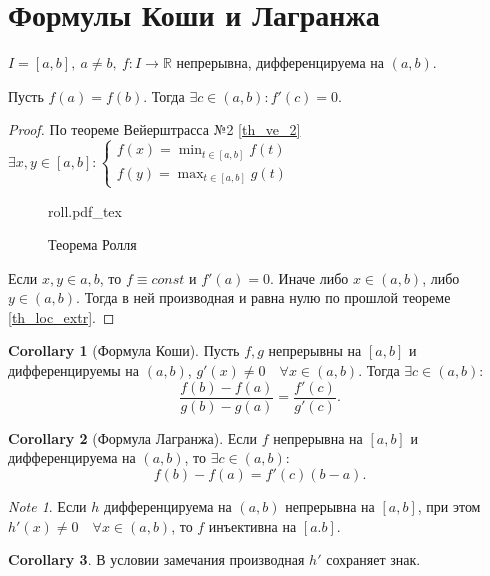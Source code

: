 \documentclass[11pt]{book}
\newcommand{\incfig}[1]{%
    \def\svgwidth{\columnwidth}
    {#1.pdf_tex}
}
\newcommand{\R}{\mathbb{R}}
\theoremstyle{definition}
\theoremstyle{plain}
\theoremstyle{plain}
\theoremstyle{definition}
\newtheorem*{cor}{Corollary}
\theoremstyle{remark}
\newtheorem*{note}{Note}
\begin{document}
\section{Формулы Коши и Лагранжа}
\begin{thm}[Ролль]
    $ I = [a, b], ~ a \ne b, ~ f: I \to \R $ непрерывна,  дифференцируема на $ (a, b)$.

    Пусть $ f(a) = f(b)$. Тогда  $ \exists c \in (a, b): f'(c) = 0$.
\end{thm}
\begin{proof}
    По теореме Вейерштрасса №2 \ref{th_ve_2} $ \exists x, y \in [a, b]:
    \begin{cases}
	f(x) = \min_{t \in [a, b]}f(t)\\
	f(y) = \max_{t \in [a, b]}g(t)
    \end{cases}$
    \begin{figure}[ht]
	\centering
	\incfig{roll}
	\caption{Теорема Ролля}
	\label{fig:roll}
    \end{figure}
    Если $ x, y \in {a, b}$, то $ f \equiv const$ и $ f'(a) = 0$.
    Иначе либо  $ x \in (a, b)$,  либо  $ y \in (a, b)$. Тогда в ней производная и равна нулю по прошлой теореме \ref{th_loc_extr}.
\end{proof}
\begin{cor}[Формула Коши]
    Пусть $ f, g$ непрерывны на  $ [a, b]$ и дифференцируемы на $ (a, b)$,  $ g'(x) \ne 0 \quad \forall x \in (a, b)$.
    Тогда $ \exists c \in (a, b)$:
    \[
	\frac{f(b)-f(a)}{g(b)-g(a)} = \frac{f'(c)}{g'(c)}
    .\]
\end{cor}
\begin{cor}[Формула Лагранжа]
    Если $ f$ непрерывна на $ [a, b]$ и дифференцируема на $ (a, b)$, то $ \exists c \in (a, b)$:
    \[
	f(b) - f(a) = f'(c) (b-a)
    .\]
\end{cor}
\begin{note}
    Если $ h$ дифференцируема на $ (a, b)$ непрерывна на $ [a, b]$, при этом $ h'(x) \ne 0 \quad \forall x \in (a, b)$, то $ f$ инъективна на  $ [a. b]$.
\end{note}
\begin{cor}
    В условии замечания производная $ h'$ сохраняет знак.
\end{cor}
\end{document}
